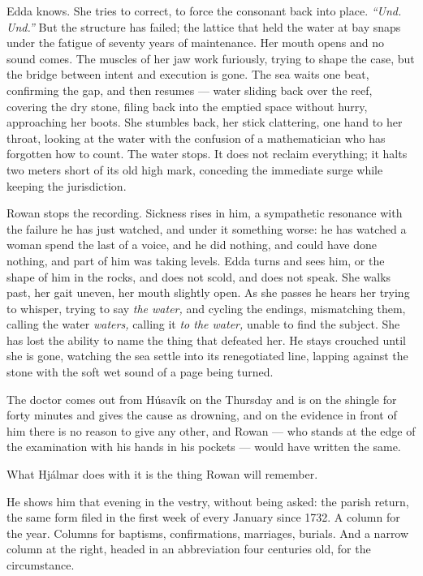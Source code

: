 \documentclass[11pt,oneside]{book}
\newcommand{\sceneline}{%
  \par\vspace{1.2em}
  \begin{center}
    \fontsize{11}{11}\selectfont \textbullet\quad\textbullet\quad\textbullet
  \end{center}
  \vspace{0.6em}\noindent\ignorespaces
}
\begin{document}
Edda knows. She tries to correct, to force the consonant back into
place. \emph{``Und. Und.''} But the structure has failed; the lattice
that held the water at bay snaps under the fatigue of seventy years of
maintenance. Her mouth opens and no sound comes. The muscles of her jaw
work furiously, trying to shape the case, but the bridge between intent
and execution is gone. The sea waits one beat, confirming the gap, and
then resumes --- water sliding back over the reef, covering the dry
stone, filing back into the emptied space without hurry, approaching her
boots. She stumbles back, her stick clattering, one hand to her throat,
looking at the water with the confusion of a mathematician who has
forgotten how to count. The water stops. It does not reclaim everything;
it halts two meters short of its old high mark, conceding the immediate
surge while keeping the jurisdiction.

Rowan stops the recording. Sickness rises in him, a sympathetic
resonance with the failure he has just watched, and under it something
worse: he has watched a woman spend the last of a voice, and he did
nothing, and could have done nothing, and part of him was taking levels.
Edda turns and sees him, or the shape of him in the rocks, and does not
scold, and does not speak. She walks past, her gait uneven, her mouth
slightly open. As she passes he hears her trying to whisper, trying to
say \emph{the water,} and cycling the endings, mismatching them, calling
the water \emph{waters,} calling it \emph{to the water,} unable to find
the subject. She has lost the ability to name the thing that defeated
her. He stays crouched until she is gone, watching the sea settle into
its renegotiated line, lapping against the stone with the soft wet sound
of a page being turned.

\sceneline

The doctor comes out from Húsavík on the Thursday and is on the shingle
for forty minutes and gives the cause as drowning, and on the evidence
in front of him there is no reason to give any other, and Rowan --- who
stands at the edge of the examination with his hands in his pockets ---
would have written the same.

What Hjálmar does with it is the thing Rowan will remember.

He shows him that evening in the vestry, without being asked: the parish
return, the same form filed in the first week of every January since
1732. A column for the year. Columns for baptisms, confirmations,
marriages, burials. And a narrow column at the right, headed in an
abbreviation four centuries old, for the circumstance.
\end{document}
